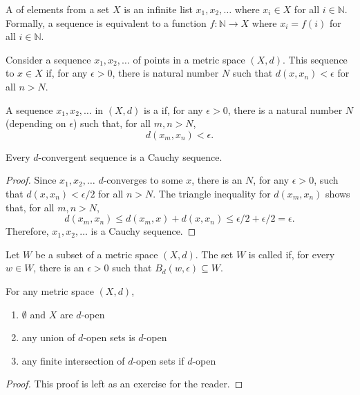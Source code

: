 \begin{definition}
A  of elements from a set $X$ is an infinite list $x_1,x_2,\ldots$ where $x_i \in X$ for all $i\in \mathbb{N}$.
Formally, a sequence is equivalent to a function $f: \mathbb{N} \rightarrow X$ where $x_i = f(i)$ for all $i\in \mathbb{N}$.
\end{definition}

\begin{definition}
Consider a sequence $x_1, x_2, \ldots$ of points in a metric space $(X,d)$.
This sequence  to $x\in X$ if, for any $\epsilon >0$, there is natural number $N$ such that $d(x,x_n) < \epsilon$ for all $n>N$.
\end{definition}

\begin{definition}
A sequence $x_1,x_2,\ldots$ in $(X,d)$ is a  if, for any $\epsilon >0$, there is a natural number $N$ (depending on $\epsilon$) such that, for all $m,n > N$,
\begin{equation*}
d \left( x_m, x_n \right) < \epsilon.
\end{equation*}
\end{definition}

\begin{theorem}
Every $d$-convergent sequence is a Cauchy sequence.
\end{theorem}
\begin{proof}
Since $x_1,x_2,\ldots$ $d$-converges to some $x$, there is an $N$, for any $\epsilon>0$, such that $d(x,x_n)<\epsilon /2$ for all $n>N$.
The triangle inequality for $d(x_m,x_n)$ shows that, for all $m,n>N$,
\[ d(x_m,x_n)\leq d(x_m,x) + d(x,x_n) \leq \epsilon/2 + \epsilon/2 = \epsilon. \]
Therefore, $x_1,x_2,\ldots$ is a Cauchy sequence.
\end{proof}

\begin{definition}
\label{definition:metspace_dopen}
Let $W$ be a subset of a metric space $(X,d)$.
The set $W$ is called  if, for every $w\in W$, there is an $\epsilon>0$ such that $B_d (w,\epsilon) \subseteq W$.
\end{definition}

\begin{theorem}
\label{theorem:d_open_closure}
For any metric space $(X,d)$,
\begin{enumerate}
\item $\emptyset$ and $X$ are $d$-open
\item any union of $d$-open sets is $d$-open
\item any finite intersection of $d$-open sets if $d$-open
\end{enumerate}
\end{theorem}
\begin{proof}
This proof is left as an exercise for the reader.
\end{proof}

